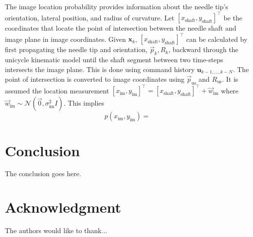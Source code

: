 \documentclass[journal,transmag]{IEEEtran}
\newcommand{\bvar}[2]{\mathbf{#1}_{#2}}
\newcommand{\usorientation}{R_{\text{us}}}
\newcommand{\uspos}{\vec{p}_{\text{us}}}
\newcommand{\shaftcoords}{\left[x_{\text{shaft}},y_{\text{shaft}}\right]^\top}
\begin{document}
The image location probability provides information about the needle tip's orientation, lateral position, and radius of curvature.  Let $\shaftcoords$ be the coordinates that locate the point of intersection between the needle shaft and image plane in image coordinates.  Given $\bvar{x}{k}$, $\shaftcoords$ can be calculated by first propagating the needle tip and orientation, $\vec{p}_k, R_k$, backward through the unicycle kinematic model until the shaft segment between two time-steps intersects the image plane.  This is done using command history $\bvar{u}{k-1,...,k-N}$.  The point of intersection is converted to image coordinates using $\uspos$ and $\usorientation$.  It is assumed the location measurement $\left[x_{\text{im}}, y_{\text{im}}\right]^\top = \shaftcoords + \vec{w}_{\text{im}}$ where $\vec{w}_{\text{im}} \sim \mathcal{N}(\vec{0}, \sigma_{\text{im}}^2 I)$.  This implies
\begin{equation*}
p(x_{\text{im}},y_{\text{im}}) = 
\end{equation*} 
\section{Conclusion}
The conclusion goes here.


\section*{Acknowledgment}
The authors would like to thank...




%
%
%
 

\end{document}
